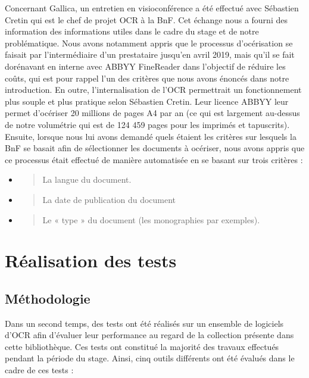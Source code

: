 \documentclass[a4paper,12pt,twoside]{book}
\begin{document}
	Concernant Gallica, un entretien en visioconférence a été effectué avec Sébastien Cretin qui est le chef de projet OCR à la BnF. Cet échange nous a fourni des information des informations utiles dans le cadre du stage et de notre problématique. Nous avons notamment appris que le processus d'océrisation se faisait par l'intermédiaire d'un prestataire jusqu'en avril 2019, mais qu'il se fait dorénavant en interne avec ABBYY FineReader dans l'objectif de réduire les coûts, qui est pour rappel l'un des critères que nous avons énoncés dans notre introduction. En outre, l'internalisation de l'OCR permettrait un fonctionnement plus souple et plus pratique selon Sébastien Cretin. Leur licence ABBYY leur permet d'océriser 20 millions de pages A4 par an (ce qui est largement au-dessus de notre volumétrie qui est de 124 459 pages pour les imprimés et tapuscrits). Ensuite, lorsque nous lui avons demandé quels étaient les critères sur lesquels la BnF se basait afin de sélectionner les documents à océriser, nous avons appris que ce processus était effectué de manière automatisée en se basant sur trois critères : \\
	
	\begin{itemize}
		\item
		\begin{quote}
			La langue du document.
		\end{quote}
		\item
		\begin{quote}
			La date de publication du document
		\end{quote}
		\item
		\begin{quote}
			Le « type » du document (les monographies par exemples).
		\end{quote}
	\end{itemize}
	
	
	
	
	\section{Réalisation des tests}
	
	\subsection{Méthodologie}
	
	Dans un second temps, des tests ont été réalisés sur un ensemble de
	logiciels d'OCR afin d'évaluer leur performance au regard de la
	collection présente dans cette bibliothèque. Ces tests ont constitué la
	majorité des travaux effectués pendant la période du stage. Ainsi, cinq
	outils différents ont été évalués dans le cadre de ces tests : \\
	
\end{document}
